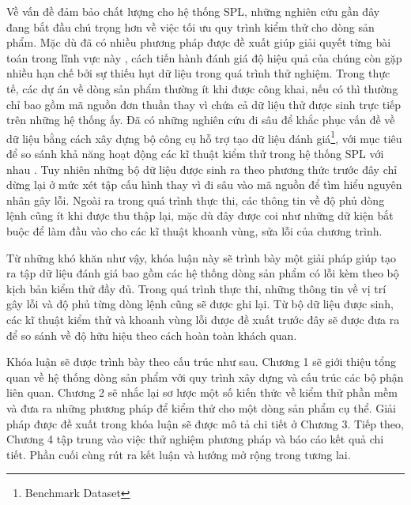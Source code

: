 Về vấn đề đảm bảo chất lượng cho hệ thống SPL, những nghiên cứu gần đây đang bắt đầu chú trọng hơn về việc tối ưu quy trình kiểm thử cho dòng sản phẩm. Mặc dù đã có nhiều phương pháp được đề xuất giúp giải quyết từng bài toán trong lĩnh vực này \cite{Piwowarski257635, Namin1572280,Kim961347, Lamancha16573, ARRIETA201818}, cách tiến hành đánh giá độ hiệu quả của chúng còn gặp nhiều hạn chế bởi sự thiếu hụt dữ liệu trong quá trình thử nghiệm. Trong thực tế, các dự án về dòng sản phẩm thường ít khi được công khai, nếu có thì thường chỉ bao gồm mã nguồn đơn thuần thay vì chứa cả dữ liệu thử được sinh trực tiếp trên những hệ thống ấy. Đã có những nghiên cứu đi sâu để khắc phục vấn đề về dữ liệu bằng cách xây dựng bộ công cụ hỗ trợ tạo dữ liệu đánh giá\footnote{Benchmark Dataset}, với mục tiêu để so sánh khả năng hoạt động các kĩ thuật kiểm thử trong hệ thống SPL với nhau \cite{Herrejon2014,Fischer3167350}. Tuy nhiên những bộ dữ liệu được sinh ra theo phương thức trước đây chỉ dừng lại ở mức xét tập cấu hình thay vì đi sâu vào mã nguồn để tìm hiểu nguyên nhân gây lỗi. Ngoài ra trong quá trình thực thi, các thông tin về độ phủ dòng lệnh cũng ít khi được thu thập lại, mặc dù đây được coi như những dữ kiện bắt buộc để làm đầu vào cho các kĩ thuật khoanh vùng, sửa lỗi của chương trình.\par
Từ những khó khăn như vậy, khóa luận này sẽ trình bày một giải pháp giúp tạo ra tập dữ liệu đánh giá bao gồm các hệ thống dòng sản phẩm có lỗi kèm theo bộ kịch bản kiểm thử đầy đủ. Trong quá trình thực thi, những thông tin về vị trí gây lỗi và độ phủ từng dòng lệnh cũng sẽ được ghi lại. Từ bộ dữ liệu được sinh, các kĩ thuật kiểm thử và khoanh vùng lỗi được đề xuất trước đây sẽ được đưa ra để so sánh về độ hữu hiệu theo cách hoàn toàn khách quan.

Khóa luận sẽ được trình bày theo cấu trúc như sau. Chương 1 sẽ giới thiệu tổng quan về hệ thống dòng sản phẩm với quy trình xây dựng và cấu trúc các bộ phận liên quan. Chương 2 sẽ nhắc lại sơ lược một số kiến thức về kiểm thử phần mềm và đưa ra những phương pháp để kiểm thử cho một dòng sản phẩm cụ thể. Giải pháp được đề xuất trong khóa luận sẽ được mô tả chi tiết ở Chương 3. Tiếp theo, Chương 4 tập trung vào việc thử nghiệm phương pháp và báo cáo kết quả chi tiết. Phần cuối cùng rút ra kết luận và hướng mở rộng trong tương lai.

\cleardoublepage